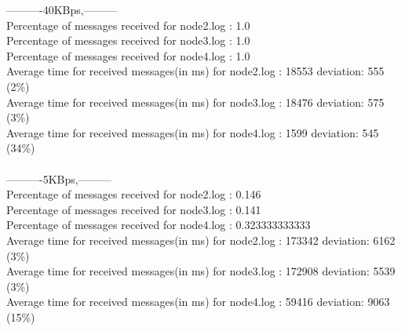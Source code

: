         ----------40KBps,---------\\
        Percentage of messages received for node2.log : 1.0\\
        Percentage of messages received for node3.log : 1.0\\
        Percentage of messages received for node4.log : 1.0\\
        Average time for received messages(in ms) for  node2.log : 18553 	deviation: 555 (2\%)\\
        Average time for received messages(in ms) for  node3.log : 18476 	deviation: 575 (3\%)\\
        Average time for received messages(in ms) for  node4.log : 1599 	deviation: 545 (34\%)\\\\
        ----------5KBps,---------\\
        Percentage of messages received for node2.log : 0.146\\
        Percentage of messages received for node3.log : 0.141\\
        Percentage of messages received for node4.log : 0.323333333333\\
        Average time for received messages(in ms) for  node2.log : 173342 	deviation: 6162 (3\%)\\
        Average time for received messages(in ms) for  node3.log : 172908 	deviation: 5539 (3\%)\\
        Average time for received messages(in ms) for  node4.log : 59416 	deviation: 9063 (15\%)\\\\

